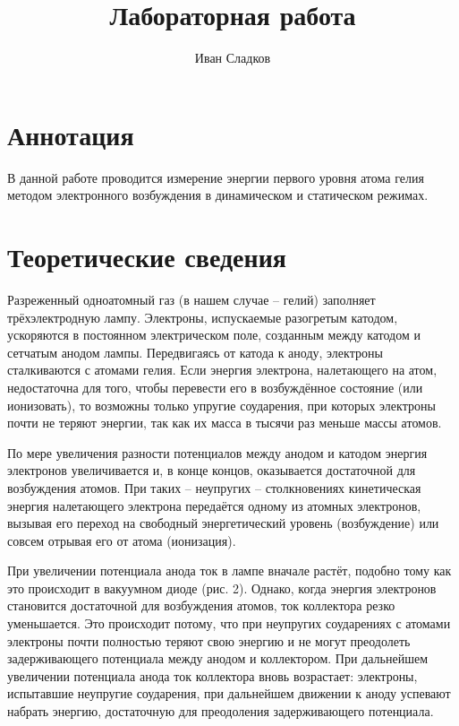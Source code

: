 \documentclass[a4paper]{article}
\title{Лабораторная работа \labnum \space \labname} %
\author{Иван Сладков}
\begin{document}
\maketitle
\thispagestyle{empty}
\section{Аннотация}
В данной работе проводится измерение энергии первого уровня атома гелия методом электронного возбуждения в динамическом и статическом режимах.

\section{Теоретические сведения}

Разреженный одноатомный газ (в нашем случае -- гелий) заполняет трёхэлектродную лампу. Электроны, испускаемые разогретым катодом, ускоряются в постоянном электрическом поле, созданным между катодом и сетчатым анодом лампы. Передвигаясь от катода к аноду, электроны сталкиваются с атомами гелия. Если энергия электрона, налетающего на атом, недостаточна для того, чтобы перевести его в возбуждённое состояние (или ионизовать), то возможны только упругие соударения, при которых электроны почти не теряют энергии, так как их масса в тысячи раз меньше массы атомов.


По мере увеличения разности потенциалов между анодом и катодом энергия электронов увеличивается и, в конце концов, оказывается достаточной для возбуждения атомов. При таких -- неупругих -- столкновениях кинетическая энергия налетающего электрона передаётся одному из атомных электронов, вызывая его переход на свободный энергетический уровень (возбуждение) или совсем отрывая его от атома (ионизация).

При увеличении потенциала анода ток в лампе вначале растёт, подобно тому как это происходит в вакуумном диоде (рис. 2). Однако, когда энергия электронов становится достаточной для возбуждения атомов, ток коллектора резко уменьшается. Это происходит потому, что при неупругих соударениях с атомами электроны почти полностью теряют свою энергию и не могут преодолеть задерживающего потенциала между анодом и коллектором. При дальнейшем увеличении потенциала анода ток коллектора вновь возрастает: электроны, испытавшие неупругие соударения, при дальнейшем движении к аноду успевают набрать энергию, достаточную для преодоления задерживающего потенциала.
\end{document}
